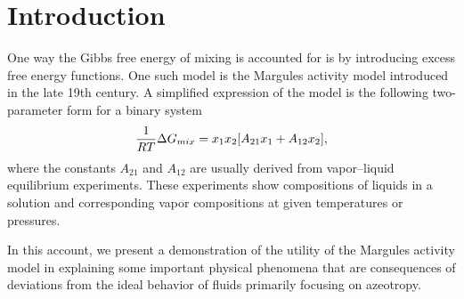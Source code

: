 \section{Introduction}



One way the Gibbs free energy of mixing is accounted for is by introducing
excess free energy functions. One such model is the Margules activity model
introduced in the late 19th century. A simplified expression of the model
is the following two-parameter form for a binary system
\begin{equation}\label{eq:margules-two-param}
    \dfrac1{RT} \Delta G_{mix} = x_1x_2 \qty[A_{21}x_1 + A_{12}x_2],
\end{equation}
where the constants $A_{21}$ and $A_{12}$ are usually derived from vapor--liquid
equilibrium experiments. These experiments show compositions of liquids in a
solution and corresponding vapor compositions at given temperatures or pressures.

In this account, we present a demonstration of the utility of the Margules
activity model in explaining some important physical phenomena that are
consequences of deviations from the ideal behavior of fluids primarily
focusing on azeotropy.
